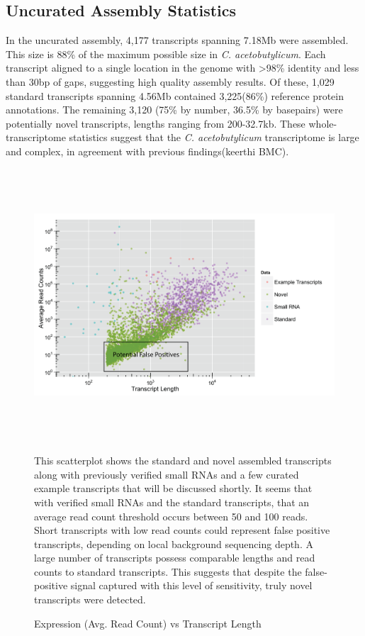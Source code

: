 \subsection{Uncurated Assembly Statistics}

In the uncurated assembly, 4,177 transcripts spanning 7.18Mb were assembled. This size is 88\% of the maximum possible size in \textit{C. acetobutylicum}. Each transcript aligned to a single location in the genome with \textgreater 98\% identity and less than 30bp of gaps, suggesting high quality assembly results. Of these, 1,029 standard transcripts spanning 4.56Mb contained 3,225(86\%) reference protein annotations. The remaining 3,120 (75\% by number, 36.5\% by basepairs) were potentially novel transcripts, lengths ranging from 200-32.7kb. These whole-transcriptome statistics suggest that the \textit{C. acetobutylicum} transcriptome is large and complex, in agreement with previous findings(keerthi BMC).

\begin{figure}[h!]
\small
\begin{center}
\includegraphics[width=\textwidth,height=4in]{images/Assembly/Summary/ExpvsLength.png}
\end{center}
\caption{Expression (Avg. Read Count) vs Transcript Length}\label{fig:5.3}
This scatterplot shows the standard and novel assembled transcripts along with previously verified small RNAs\cite{39} and a few curated example transcripts that will be discussed shortly. It seems that with verified small RNAs and the standard transcripts, that an average read count threshold occurs between 50 and 100 reads. Short transcripts with low read counts could represent false positive transcripts, depending on local background sequencing depth. A large number of transcripts possess comparable lengths and read counts to standard transcripts. This suggests that despite the false-positive signal captured with this level of sensitivity, truly novel transcripts were detected.
\end{figure}

